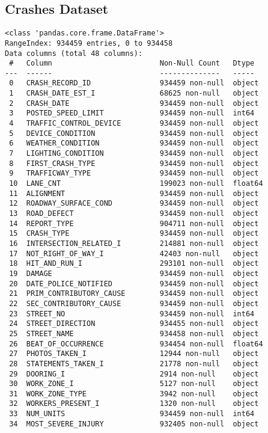 \documentclass[12pt]{article}
\begin{document}
\subsection{Crashes Dataset}
{\scriptsize
\begin{verbatim}
<class 'pandas.core.frame.DataFrame'>
RangeIndex: 934459 entries, 0 to 934458
Data columns (total 48 columns):
 #   Column                         Non-Null Count   Dtype  
---  ------                         --------------   -----  
 0   CRASH_RECORD_ID                934459 non-null  object 
 1   CRASH_DATE_EST_I               68625 non-null   object 
 2   CRASH_DATE                     934459 non-null  object 
 3   POSTED_SPEED_LIMIT             934459 non-null  int64  
 4   TRAFFIC_CONTROL_DEVICE         934459 non-null  object 
 5   DEVICE_CONDITION               934459 non-null  object 
 6   WEATHER_CONDITION              934459 non-null  object 
 7   LIGHTING_CONDITION             934459 non-null  object 
 8   FIRST_CRASH_TYPE               934459 non-null  object 
 9   TRAFFICWAY_TYPE                934459 non-null  object 
 10  LANE_CNT                       199023 non-null  float64
 11  ALIGNMENT                      934459 non-null  object 
 12  ROADWAY_SURFACE_COND           934459 non-null  object 
 13  ROAD_DEFECT                    934459 non-null  object 
 14  REPORT_TYPE                    904711 non-null  object 
 15  CRASH_TYPE                     934459 non-null  object 
 16  INTERSECTION_RELATED_I         214881 non-null  object 
 17  NOT_RIGHT_OF_WAY_I             42403 non-null   object 
 18  HIT_AND_RUN_I                  293101 non-null  object 
 19  DAMAGE                         934459 non-null  object 
 20  DATE_POLICE_NOTIFIED           934459 non-null  object 
 21  PRIM_CONTRIBUTORY_CAUSE        934459 non-null  object 
 22  SEC_CONTRIBUTORY_CAUSE         934459 non-null  object 
 23  STREET_NO                      934459 non-null  int64  
 24  STREET_DIRECTION               934455 non-null  object 
 25  STREET_NAME                    934458 non-null  object 
 26  BEAT_OF_OCCURRENCE             934454 non-null  float64
 27  PHOTOS_TAKEN_I                 12944 non-null   object 
 28  STATEMENTS_TAKEN_I             21778 non-null   object 
 29  DOORING_I                      2914 non-null    object 
 30  WORK_ZONE_I                    5127 non-null    object 
 31  WORK_ZONE_TYPE                 3942 non-null    object 
 32  WORKERS_PRESENT_I              1320 non-null    object 
 33  NUM_UNITS                      934459 non-null  int64  
 34  MOST_SEVERE_INJURY             932405 non-null  object 

\end{verbatim}}
\end{document}
